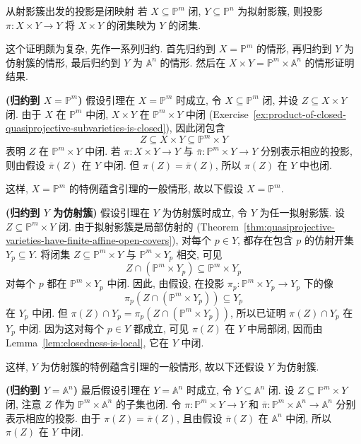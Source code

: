 \begin{Lemma}{从射影簇出发的投影是闭映射}\leavevmode\label{lem:projection-from-projective-factor-is-closed}
若 $X\subseteq\mathbb{P}^{m}$ 闭, $Y\subseteq\mathbb{P}^{n}$ 为拟射影簇, 则投影 $\pi:X\times Y\to Y$ 将 $X\times Y$ 的闭集映为 $Y$ 的闭集.
\end{Lemma}
\begin{Proof}
这个证明颇为复杂, 先作一系列归约. 首先归约到 $X=\mathbb{P}^{m}$ 的情形, 再归约到 $Y$ 为仿射簇的情形, 最后归约到 $Y$ 为 $\mathbb{A}^{n}$ 的情形. 然后在 $X\times Y=\mathbb{P}^{m}\times\mathbb{A}^{n}$ 的情形证明结果.

\textbf{(归约到 $X=\mathbb{P}^{m}$)} 假设引理在 $X=\mathbb{P}^{m}$ 时成立, 令 $X\subseteq\mathbb{P}^{m}$ 闭, 并设 $Z\subseteq X\times Y$ 闭. 由于 $X$ 在 $\mathbb{P}^{m}$ 中闭, $X\times Y$ 在 $\mathbb{P}^{m}\times Y$ 中闭 (Exercise~\ref{ex:product-of-closed-quasiprojective-subvarieties-is-closed}), 因此闭包含
\[
  Z\subseteq X\times Y\subseteq\mathbb{P}^{m}\times Y
\]
表明 $Z$ 在 $\mathbb{P}^{m}\times Y$ 中闭. 若 $\pi:X\times Y\to Y$ 与 $\overline{\pi}:\mathbb{P}^{m}\times Y\to Y$ 分别表示相应的投影, 则由假设 $\overline{\pi}(Z)$ 在 $Y$ 中闭. 但 $\pi(Z)=\overline{\pi}(Z)$, 所以 $\pi(Z)$ 在 $Y$ 中也闭.

这样, $X=\mathbb{P}^{m}$ 的特例蕴含引理的一般情形, 故以下假设 $X=\mathbb{P}^{m}$.

\textbf{(归约到 $Y$ 为仿射簇)} 假设引理在 $Y$ 为仿射簇时成立, 令 $Y$ 为任一拟射影簇. 设 $Z\subseteq\mathbb{P}^{m}\times Y$ 闭. 由于拟射影簇是局部仿射的 (Theorem~\ref{thm:quasiprojective-varieties-have-finite-affine-open-covers}), 对每个 $p\in Y$, 都存在包含 $p$ 的仿射开集 $Y_{p}\subseteq Y$. 将闭集 $Z\subseteq\mathbb{P}^{m}\times Y$ 与 $\mathbb{P}^{m}\times Y_{p}$ 相交, 可见
\[
  Z\cap(\mathbb{P}^{m}\times Y_{p})\subseteq\mathbb{P}^{m}\times Y_{p}
\]
对每个 $p$ 都在 $\mathbb{P}^{m}\times Y_{p}$ 中闭. 因此, 由假设, 在投影 $\pi_{p}:\mathbb{P}^{m}\times Y_{p}\to Y_{p}$ 下的像
\[
  \pi_{p}(Z\cap(\mathbb{P}^{m}\times Y_{p}))\subseteq Y_{p}
\]
在 $Y_{p}$ 中闭. 但 $\pi(Z)\cap Y_{p}=\pi_{p}(Z\cap(\mathbb{P}^{m}\times Y_{p}))$, 所以已证明 $\pi(Z)\cap Y_{p}$ 在 $Y_{p}$ 中闭. 因为这对每个 $p\in Y$ 都成立, 可见 $\pi(Z)$ 在 $Y$ 中局部闭, 因而由 Lemma~\ref{lem:closedness-is-local}, 它在 $Y$ 中闭.

这样, $Y$ 为仿射簇的特例蕴含引理的一般情形, 故以下还假设 $Y$ 为仿射簇.

\textbf{(归约到 $Y=\mathbb{A}^{n}$)} 最后假设引理在 $Y=\mathbb{A}^{n}$ 时成立, 令 $Y\subseteq\mathbb{A}^{n}$ 闭. 设 $Z\subseteq\mathbb{P}^{m}\times Y$ 闭, 注意 $Z$ 作为 $\mathbb{P}^{m}\times\mathbb{A}^{n}$ 的子集也闭. 令 $\pi:\mathbb{P}^{m}\times Y\to Y$ 和 $\overline{\pi}:\mathbb{P}^{m}\times\mathbb{A}^{n}\to\mathbb{A}^{n}$ 分别表示相应的投影. 由于 $\pi(Z)=\overline{\pi}(Z)$, 且由假设 $\overline{\pi}(Z)$ 在 $\mathbb{A}^{n}$ 中闭, 所以 $\pi(Z)$ 在 $Y$ 中闭.


\end{Proof}
